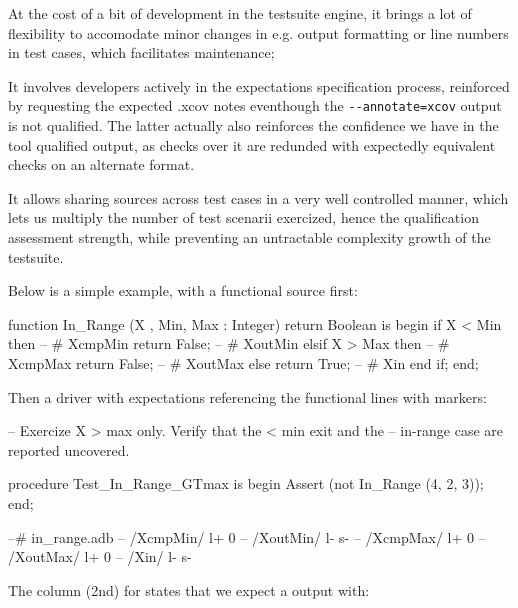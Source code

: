 \documentclass {report}
\begin{document}
\begin{Itemize}
\item%
  At the cost of a bit of development in the testsuite engine, it brings
  a lot of flexibility to accomodate minor changes in e.g. output formatting
  or line numbers in test cases, which facilitates maintenance;
%
\item%
  It involves developers actively in the expectations specification
  process, reinforced by requesting the expected .xcov notes
  eventhough the \verb|--annotate=xcov| output is not qualified.
  The latter actually also reinforces the confidence we have in the tool
  qualified output, as checks over it are redunded with expectedly equivalent
  checks on an alternate format.
%
\item%
  It allows sharing sources across test cases in a very well controlled
  manner, which lets us multiply the number of test scenarii exercized, hence
  the qualification assessment strength, while preventing an untractable
  complexity growth of the testsuite.

\end{Itemize}
 
Below is a simple example, with a functional  source
first:

\begin{Text}
      function In_Range (X , Min, Max : Integer) return Boolean is
      begin
         if X < Min then     -- # XcmpMin
            return False;    -- # XoutMin
         elsif X > Max then  -- # XcmpMax
            return False;    -- # XoutMax
         else
            return True;     -- # Xin
         end if;
      end;
\end{Text}

Then a driver with expectations referencing the functional
lines with markers:

\begin{Text}
      --  Exercize X > max only. Verify that the < min exit and the
      --  in-range case are reported uncovered.

      procedure Test_In_Range_GTmax is
      begin
         Assert (not In_Range (4, 2, 3));
      end;

      --# in_range.adb
      --  /XcmpMin/  l+ 0
      --  /XoutMin/  l- s-
      --  /XcmpMax/  l+ 0
      --  /XoutMax/  l+ 0
      --  /Xin/      l- s-
\end{Text}

The  column (2nd) for  states
that we expect a  output with:
\end{document}
